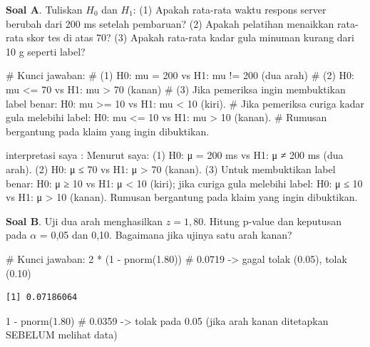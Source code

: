 \documentclass[
  indonesian,
  letterpaper,
]{book}
\newenvironment{Shaded}{\begin{snugshade}}{\end{snugshade}}
\newcommand{\CommentTok}[1]{\textcolor[rgb]{0.37,0.37,0.37}{#1}}
\newcommand{\DecValTok}[1]{\textcolor[rgb]{0.68,0.00,0.00}{#1}}
\newcommand{\FloatTok}[1]{\textcolor[rgb]{0.68,0.00,0.00}{#1}}
\newcommand{\FunctionTok}[1]{\textcolor[rgb]{0.28,0.35,0.67}{#1}}
\newcommand{\NormalTok}[1]{\textcolor[rgb]{0.00,0.23,0.31}{#1}}
\newcommand{\SpecialCharTok}[1]{\textcolor[rgb]{0.37,0.37,0.37}{#1}}
\begin{document}
\textbf{Soal A}. Tuliskan \(H_0\) dan \(H_1\): (1) Apakah rata-rata
waktu respons server berubah dari 200 ms setelah pembaruan? (2) Apakah
pelatihan menaikkan rata-rata skor tes di atas 70? (3) Apakah rata-rata
kadar gula minuman kurang dari 10 g seperti label?

\begin{Shaded}
\begin{Highlighting}[]
\CommentTok{\# Kunci jawaban:}
\CommentTok{\# (1) H0: mu = 200 vs H1: mu != 200 (dua arah)}
\CommentTok{\# (2) H0: mu \textless{}= 70 vs H1: mu \textgreater{} 70 (kanan)}
\CommentTok{\# (3) Jika pemeriksa ingin membuktikan label benar: H0: mu \textgreater{}= 10 vs H1: mu \textless{} 10 (kiri).}
\CommentTok{\#     Jika pemeriksa curiga kadar gula melebihi label: H0: mu \textless{}= 10 vs H1: mu \textgreater{} 10 (kanan).}
\CommentTok{\#     Rumusan bergantung pada klaim yang ingin dibuktikan.}
\end{Highlighting}
\end{Shaded}

interpretasi saya : Menurut saya: (1) H0: μ = 200 ms vs H1: μ ≠ 200 ms
(dua arah). (2) H0: μ ≤ 70 vs H1: μ \textgreater{} 70 (kanan). (3) Untuk
membuktikan label benar: H0: μ ≥ 10 vs H1: μ \textless{} 10 (kiri); jika
curiga gula melebihi label: H0: μ ≤ 10 vs H1: μ \textgreater{} 10
(kanan). Rumusan bergantung pada klaim yang ingin dibuktikan.

\textbf{Soal B}. Uji dua arah menghasilkan \(z = 1{,}80\). Hitung
p-value dan keputusan pada \(\alpha\) = 0,05 dan 0,10. Bagaimana jika
ujinya satu arah kanan?

\begin{Shaded}
\begin{Highlighting}[]
\CommentTok{\# Kunci jawaban:}
\DecValTok{2} \SpecialCharTok{*}\NormalTok{ (}\DecValTok{1} \SpecialCharTok{{-}} \FunctionTok{pnorm}\NormalTok{(}\FloatTok{1.80}\NormalTok{))   }\CommentTok{\# 0.0719 {-}\textgreater{} gagal tolak (0.05), tolak (0.10)}
\end{Highlighting}
\end{Shaded}

\begin{verbatim}
[1] 0.07186064
\end{verbatim}

\begin{Shaded}
\begin{Highlighting}[]
\DecValTok{1} \SpecialCharTok{{-}} \FunctionTok{pnorm}\NormalTok{(}\FloatTok{1.80}\NormalTok{)         }\CommentTok{\# 0.0359 {-}\textgreater{} tolak pada 0.05 (jika arah kanan ditetapkan SEBELUM melihat data)}
\end{Highlighting}
\end{Shaded}
\end{document}
